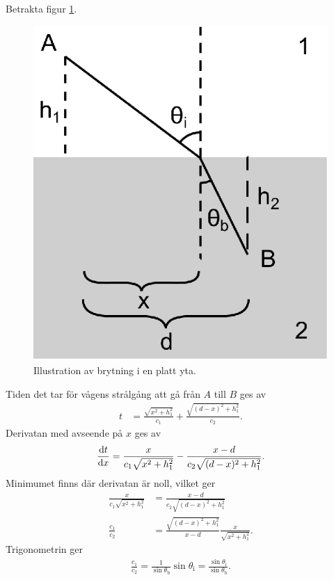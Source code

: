 \deriv
Betrakta figur \ref{fig:refraction}.
\begin{figure}[!ht]
	\centering
	\includegraphics[scale=1]{./Images/refraction.eps}
	\caption{Illustration av brytning i en platt yta.}
	\label{fig:refraction}
\end{figure}
Tiden det tar för vågens strålgång att gå från $A$ till $B$ ges av
\begin{align*}
	t &= \frac{\sqrt{x^2 + h_1^2}}{c_1} + \frac{\sqrt{(d - x)^2 + h_1^2}}{c_2}.
\end{align*}
Derivatan med avseende på $x$ ges av
\begin{align*}
	\dv{t}{x} = \frac{x}{c_1\sqrt{x^2 + h_1^2}} - \frac{x - d}{c_2\sqrt{(d - x)^2 + h_1^2}}.
\end{align*}
Minimumet finns där derivatan är noll, vilket ger
\begin{align*}
	\frac{x}{c_1\sqrt{x^2 + h_1^2}} &= \frac{x - d}{c_2\sqrt{(d - x)^2 + h_1^2}} \\
	\frac{c_1}{c_2}                 &= \frac{\sqrt{(d - x)^2 + h_1^2}}{x - d}\frac{x}{\sqrt{x^2 + h_1^2}}.
\end{align*}
Trigonometrin ger
\begin{align*}
	\frac{c_1}{c_2} = \frac{1}{\sin{\theta_{\text{b}}}}\sin{\theta_{\text{i}}} = \frac{\sin{\theta_{\text{i}}}}{\sin{\theta_{\text{b}}}}.
\end{align*}

